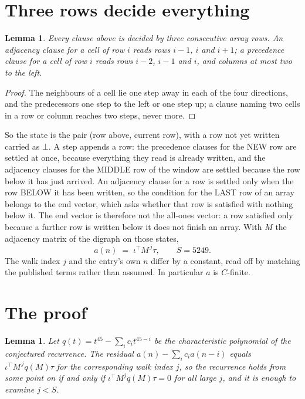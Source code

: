 \documentclass[11pt,a4paper]{article}
\theoremstyle{plain}
\newtheorem{lemma}[theorem]{Lemma}
\theoremstyle{definition}
\begin{document}
\section{Three rows decide everything}

\begin{lemma}\label{lem:win}
Every clause above is decided by three consecutive array rows. An adjacency clause for a cell
of row $i$ reads rows $i-1$, $i$ and $i+1$; a precedence clause for a cell of row $i$ reads
rows $i-2$, $i-1$ and $i$, and columns at most two to the left.
\end{lemma}

\begin{proof}
The neighbours of a cell lie one step away in each of the four directions, and the predecessors
one step to the left or one step up; a clause naming two cells in a row or column reaches two
steps, never more.
\end{proof}

So the state is the pair (row above, current row), with a row not yet written carried as
$\bot$. A step appends a row: the precedence clauses for the NEW row are settled at once,
because everything they read is already written, and the adjacency clauses for the MIDDLE row
of the window are settled because the row below it has just arrived. An adjacency clause for a row is settled only when the row BELOW it has been
written, so the condition for the LAST row of an array belongs to the end vector, which asks
whether that row is satisfied with nothing below it. The end vector is therefore not the
all-ones vector: a row satisfied only because a further row is written below it does not
finish an array. With $M$ the
adjacency matrix of the digraph on those states,
\[
a(n)\;=\;\iota^{\!\top}M^{\,j}\tau ,\qquad S=5249.
\]
The walk index $j$ and the entry's own $n$ differ by a constant, read off by matching the
published terms rather than assumed. In particular $a$ is $C$-finite.

\section{The proof}

\begin{lemma}\label{lem:crit}
Let $q(t)=t^{45}-\sum_i c_it^{45-i}$ be the characteristic polynomial of the
conjectured recurrence. The residual $a(n)-\sum_ic_ia(n-i)$ equals
$\iota^{\!\top}M^{\,j}q(M)\tau$ for the corresponding walk index $j$, so the recurrence
holds from some point on if and only if $\iota^{\!\top}M^{j}q(M)\tau=0$ for all large $j$,
and it is enough to examine $j<S$.
\end{lemma}
\end{document}

